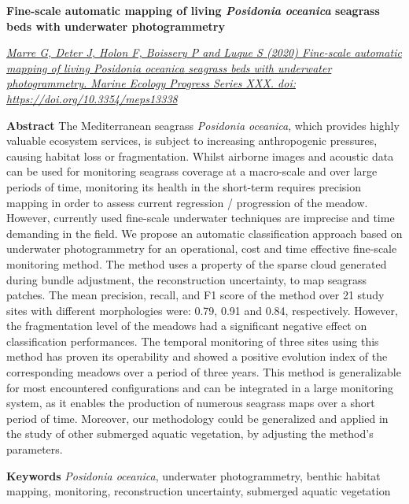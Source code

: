 \clearpage

\noindent\textbf{Fine-scale automatic mapping of living \textit{Posidonia oceanica} seagrass beds with underwater photogrammetry}


\noindent\href{https://doi.org/10.3354/meps13338}{\textit{Marre G, Deter J, Holon F, Boissery P and Luque S (2020) Fine-scale automatic mapping of living \textit{Posidonia oceanica} seagrass beds with underwater photogrammetry. Marine Ecology Progress Series XXX. doi: https://doi.org/10.3354/meps13338}}

\medskip

\noindent\textbf{Abstract}
The Mediterranean seagrass \textit{Posidonia oceanica}, which provides highly valuable ecosystem services, is subject to increasing anthropogenic pressures, causing habitat loss or fragmentation. Whilst airborne images and acoustic data can be used for monitoring seagrass coverage at a macro-scale and over large periods of time, monitoring its health in the short-term requires precision mapping in order to assess current regression / progression of the meadow. However, currently used fine-scale underwater techniques are imprecise and time demanding in the field. We propose an automatic classification approach based on underwater photogrammetry for an operational, cost and time effective fine-scale monitoring method. The method uses a property of the sparse cloud generated during bundle adjustment, the reconstruction uncertainty, to map seagrass patches. The mean precision, recall, and F1 score of the method over 21 study sites with different morphologies were: 0.79, 0.91 and 0.84, respectively. However, the fragmentation level of the meadows had a significant negative effect on classification performances. The temporal monitoring of three sites using this method has proven its operability and showed a positive evolution index of the corresponding meadows over a period of three years. This method is generalizable for most encountered configurations and can be integrated in a large monitoring system, as it enables the production of numerous seagrass maps over a short period of time. Moreover, our methodology could be generalized and applied in the study of other submerged aquatic vegetation, by adjusting the method’s parameters.

\noindent\textbf{Keywords}
\textit{Posidonia oceanica}, underwater photogrammetry, benthic habitat mapping, monitoring, reconstruction uncertainty, submerged aquatic vegetation

